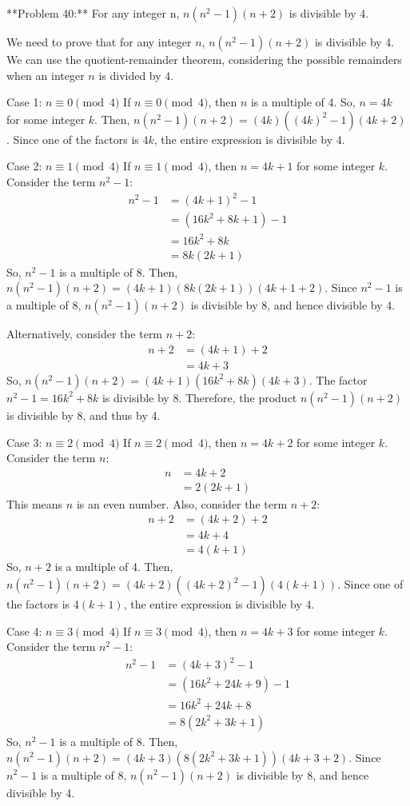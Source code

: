 \documentclass{article}
\begin{document}
**Problem 40:** For any integer n, $n(n^2 - 1)(n + 2)$ is divisible by 4.

We need to prove that for any integer $n$, $n(n^2 - 1)(n + 2)$ is divisible by 4. We can use the quotient-remainder theorem, considering the possible remainders when an integer $n$ is divided by 4.

Case 1: $n \equiv 0 \pmod{4}$
If $n \equiv 0 \pmod{4}$, then $n$ is a multiple of 4.
So, $n = 4k$ for some integer $k$.
Then, $n(n^2 - 1)(n + 2) = (4k)((4k)^2 - 1)(4k + 2)$.
Since one of the factors is $4k$, the entire expression is divisible by 4.

Case 2: $n \equiv 1 \pmod{4}$
If $n \equiv 1 \pmod{4}$, then $n = 4k + 1$ for some integer $k$.
Consider the term $n^2 - 1$:
\begin{align*} n^2 - 1 &= (4k + 1)^2 - 1 \\ &= (16k^2 + 8k + 1) - 1 \\ &= 16k^2 + 8k \\ &= 8k(2k + 1)\end{align*}
So, $n^2 - 1$ is a multiple of 8.
Then, $n(n^2 - 1)(n + 2) = (4k + 1)(8k(2k + 1))(4k + 1 + 2)$.
Since $n^2 - 1$ is a multiple of 8, $n(n^2 - 1)(n + 2)$ is divisible by 8, and hence divisible by 4.

Alternatively, consider the term $n+2$:
\begin{align*} n + 2 &= (4k + 1) + 2 \\ &= 4k + 3\end{align*}
So, $n(n^2 - 1)(n + 2) = (4k + 1)(16k^2 + 8k)(4k + 3)$.
The factor $n^2 - 1 = 16k^2 + 8k$ is divisible by 8. Therefore, the product $n(n^2 - 1)(n + 2)$ is divisible by 8, and thus by 4.

Case 3: $n \equiv 2 \pmod{4}$
If $n \equiv 2 \pmod{4}$, then $n = 4k + 2$ for some integer $k$.
Consider the term $n$:
\begin{align*} n &= 4k + 2 \\ &= 2(2k + 1)\end{align*}
This means $n$ is an even number.
Also, consider the term $n+2$:
\begin{align*} n + 2 &= (4k + 2) + 2 \\ &= 4k + 4 \\ &= 4(k + 1)\end{align*}
So, $n+2$ is a multiple of 4.
Then, $n(n^2 - 1)(n + 2) = (4k + 2)((4k + 2)^2 - 1)(4(k + 1))$.
Since one of the factors is $4(k+1)$, the entire expression is divisible by 4.

Case 4: $n \equiv 3 \pmod{4}$
If $n \equiv 3 \pmod{4}$, then $n = 4k + 3$ for some integer $k$.
Consider the term $n^2 - 1$:
\begin{align*} n^2 - 1 &= (4k + 3)^2 - 1 \\ &= (16k^2 + 24k + 9) - 1 \\ &= 16k^2 + 24k + 8 \\ &= 8(2k^2 + 3k + 1)\end{align*}
So, $n^2 - 1$ is a multiple of 8.
Then, $n(n^2 - 1)(n + 2) = (4k + 3)(8(2k^2 + 3k + 1))(4k + 3 + 2)$.
Since $n^2 - 1$ is a multiple of 8, $n(n^2 - 1)(n + 2)$ is divisible by 8, and hence divisible by 4.
\end{document}
